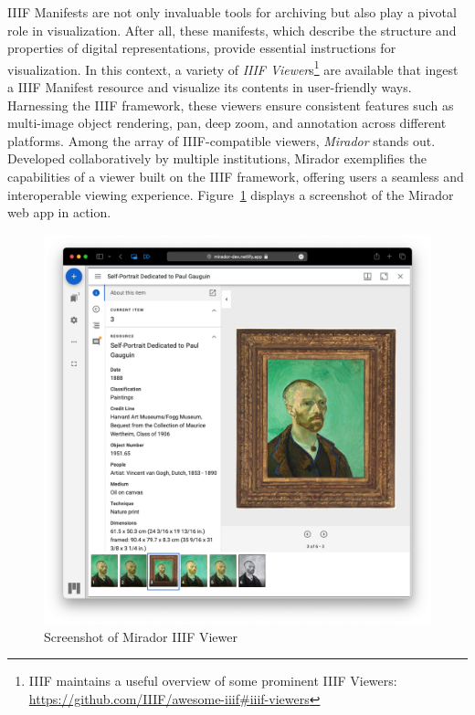 IIIF Manifests are not only invaluable tools for archiving but also play a pivotal role in visualization. After all, these manifests, which describe the structure and properties of digital representations, provide essential instructions for visualization. In this context, a variety of \textit{IIIF Viewer}s\footnote{IIIF maintains a useful overview of some prominent IIIF Viewers: \url{https://github.com/IIIF/awesome-iiif\#iiif-viewers}} are available that ingest a IIIF Manifest resource and visualize its contents in user-friendly ways. Harnessing the IIIF framework, these viewers ensure consistent features such as multi-image object rendering, pan, deep zoom, and annotation across different platforms. Among the array of IIIF-compatible viewers, \textit{Mirador} stands out. Developed collaboratively by multiple institutions, Mirador exemplifies the capabilities of a viewer built on the IIIF framework, offering users a seamless and interoperable viewing experience. Figure~\ref{fig:mirador} displays a screenshot of the Mirador web app in action. \citep{snydman2015international}

\begin{figure}[htbp]
    \centering
	\includegraphics[width=\textwidth]{images/mirador.png}
	\caption{Screenshot of Mirador IIIF Viewer}
	\label{fig:mirador}
\end{figure}